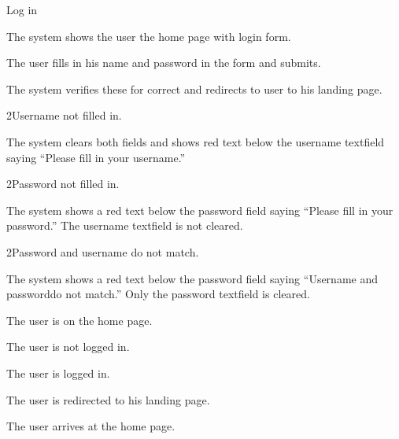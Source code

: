 
\begin{uc}{Log in}

    \begin{uc-mss}
    \item The system shows the user the home page with login form.
    \item The user fills in his name and password in the form and submits.
    \item The system verifies these for correct and redirects to user to his
        landing page.
    \end{uc-mss}

    \begin{uc-ext}

        \begin{uc-fail}{2}{Username not filled in.}
        \item The system clears both fields and shows red text below the
            username textfield saying ``Please fill in your username.''
        \end{uc-fail}

        \begin{uc-fail}{2}{Password not filled in.}
        \item The system shows a red text below the password field saying
            ``Please fill in your password.'' The username textfield is not
            cleared.
        \end{uc-fail}

        \begin{uc-fail}{2}{Password and username do not match.}
        \item The system shows a red text below the password field saying
            ``Username and passworddo not match.'' Only the password textfield
            is cleared.
        \end{uc-fail}

    \end{uc-ext}

    \begin{uc-pre}
    \item The user is on the home page.
    \item The user is not logged in.
    \end{uc-pre}

    \begin{uc-post}
    \item The user is logged in.
    \item The user is redirected to his landing page.
    \end{uc-post}

    \begin{uc-trig}
        The user arrives at the home page.
    \end{uc-trig}

\end{uc}

